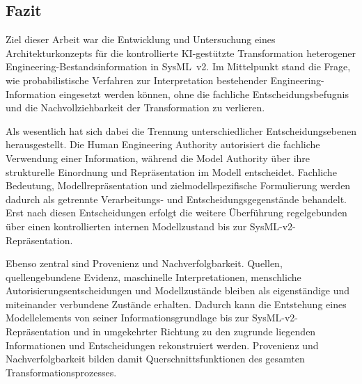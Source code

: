 \subsection{Fazit}
\label{sec:fazit}

Ziel dieser Arbeit war die Entwicklung und Untersuchung eines
Architekturkonzepts für die kontrollierte KI-gestützte Transformation
heterogener Engineering-Bestandsinformation in SysML~v2. Im Mittelpunkt
stand die Frage, wie probabilistische Verfahren zur Interpretation
bestehender Engineering-Information eingesetzt werden können, ohne die
fachliche Entscheidungsbefugnis und die Nachvollziehbarkeit der
Transformation zu verlieren.

Als wesentlich hat sich dabei die Trennung unterschiedlicher
Entscheidungsebenen herausgestellt. Die Human Engineering Authority
autorisiert die fachliche Verwendung einer Information, während die Model
Authority über ihre strukturelle Einordnung und Repräsentation im Modell
entscheidet. Fachliche Bedeutung, Modellrepräsentation und
zielmodellspezifische Formulierung werden dadurch als getrennte
Verarbeitungs- und Entscheidungsgegenstände behandelt. Erst nach diesen
Entscheidungen erfolgt die weitere Überführung regelgebunden über einen
kontrollierten internen Modellzustand bis zur SysML-v2-Repräsentation.

Ebenso zentral sind Provenienz und Nachverfolgbarkeit. Quellen,
quellengebundene Evidenz, maschinelle Interpretationen, menschliche
Autorisierungsentscheidungen und Modellzustände bleiben als eigenständige
und miteinander verbundene Zustände erhalten. Dadurch kann die Entstehung
eines Modellelements von seiner Informationsgrundlage bis zur
SysML-v2-Repräsentation und in umgekehrter Richtung zu den zugrunde liegenden
Informationen und Entscheidungen rekonstruiert werden. Provenienz und
Nachverfolgbarkeit bilden damit Querschnittsfunktionen des gesamten
Transformationsprozesses.

